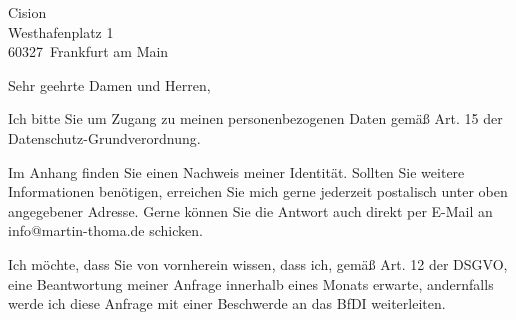 \documentclass[a4paper, 12pt, KOMAold]{scrlttr2}
\makeatletter
\newcommand{\myEmail}{info@martin-thoma.de}    %
\newcommand{\Empfaenger}{Cision}            %
\newcommand{\EStrasse}{Westhafenplatz 1}    %
\newcommand{\EPLZ}{60327}                   %
\newcommand{\EOrt}{Frankfurt am Main}       %
\newcommand{\Datenschutzbehoerde}{BfDI}  %
\makeatother
\begin{document}
    \begin{letter}{\Empfaenger \\ \EStrasse \\ \EPLZ~\EOrt}
    \date{\today}%
    \subject{DSGVO Anfrage}
    \opening{Sehr geehrte Damen und Herren,}


    Ich bitte Sie um Zugang zu meinen personenbezogenen Daten gemäß Art. 15 der
    Datenschutz-Grundverordnung.

    Im Anhang finden Sie einen Nachweis meiner Identität. Sollten Sie weitere
    Informationen benötigen, erreichen Sie mich gerne jederzeit postalisch
    unter oben angegebener Adresse. Gerne können Sie die Antwort auch direkt
    per E-Mail an \myEmail{} schicken.

    Ich möchte, dass Sie von vornherein wissen, dass ich, gemäß Art. 12 der
    DSGVO, eine Beantwortung meiner Anfrage innerhalb eines Monats erwarte,
    andernfalls werde ich diese Anfrage mit einer Beschwerde an das
    \Datenschutzbehoerde{} weiterleiten.


\end{letter}
\end{document}
